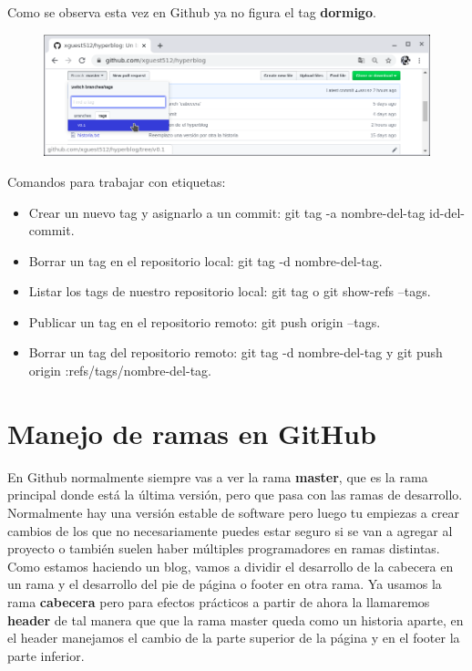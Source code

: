\documentclass{article}
\begin{document}
Como se observa esta vez en Github ya no figura el tag \textbf{dormigo}.

\begin{figure}[h!]
  \centering
  \includegraphics[scale=0.75]{./Pictures/246_tag_delete_github.png}
\end{figure}


Comandos para trabajar con etiquetas:

\begin{itemize}
  \item Crear un nuevo tag y asignarlo a un commit: git tag -a nombre-del-tag
    id-del-commit.
  \item Borrar un tag en el repositorio local: git tag -d nombre-del-tag.
  \item Listar los tags de nuestro repositorio local: git tag o git show-refs
    --tags.
  \item Publicar un tag en el repositorio remoto: git push origin --tags.
  \item Borrar un tag del repositorio remoto: git tag -d nombre-del-tag y git
    push origin :refs/tags/nombre-del-tag.
\end{itemize}

\newpage

\section{Manejo de ramas en GitHub}%
En Github normalmente siempre vas a ver la rama \textbf{master}, que es la rama
principal donde está la última versión, pero que pasa con las ramas de
desarrollo. Normalmente hay una versión estable de software pero luego tu
empiezas a crear cambios de los que no necesariamente puedes estar seguro si se
van a agregar al proyecto o también suelen haber múltiples programadores en
ramas distintas.\\

Como estamos haciendo un blog, vamos a dividir el desarrollo de la cabecera en
un rama y el desarrollo del pie de página o footer en otra rama. Ya usamos la
rama \textbf{cabecera} pero para efectos prácticos a partir de ahora la
llamaremos \textbf{header} de tal manera que que la rama master queda como un
historia aparte, en el header manejamos el cambio de la parte superior de la
página y en el footer la parte inferior.\\
\end{document}
